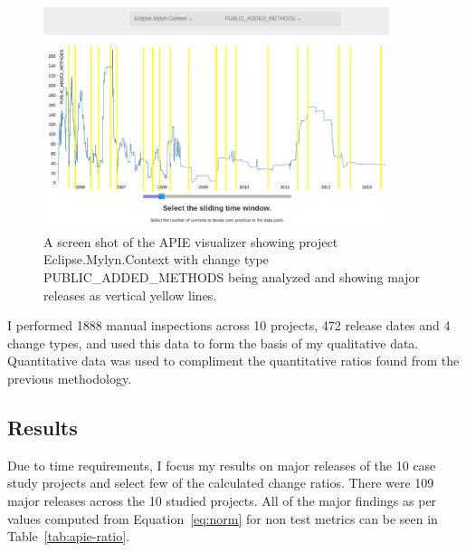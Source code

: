 \begin{figure}[tb!]
\centering
\includegraphics[width=0.9\textwidth]{figures/APIE.png}
\caption{A screen shot of the APIE visualizer showing project Eclipse.Mylyn.Context with change type PUBLIC\_ADDED\_METHODS being analyzed and showing
major releases as vertical yellow lines.\label{fig:apie}}
\end{figure}

I performed 1888 manual inspections across 10 projects, 472 release dates and 4 change types, and used this data to form the basis of my qualitative data.
Quantitative data was used to compliment the quantitative ratios found from the previous methodology. 

\subsection{Results}
\label{sec:apie-results}

Due to time requirements, I focus my results on major releases of the 10 case study projects and select few of the calculated change ratios. 
There were 109 major releases across the 10 studied projects. All of the major findings as per values computed from Equation~\ref{eq:norm} for non test metrics
can be seen in Table~\ref{tab:apie-ratio}.

